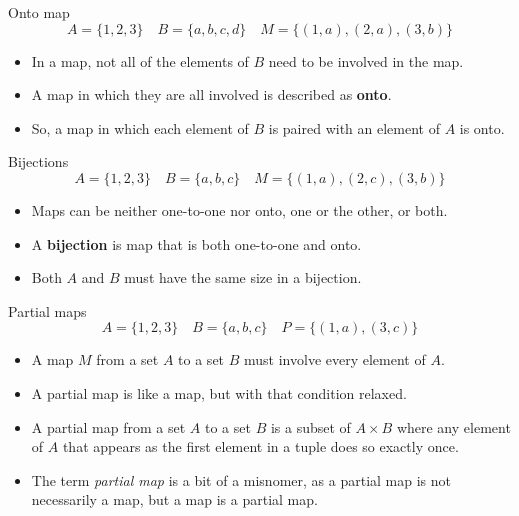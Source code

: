\documentclass{beamer}
\newenvironment{topdisp}{\color{gmitred}\vspace{-4mm}}{\vspace{-4mm}}
\begin{document}
\begin{frame}{Onto map}
  \begin{topdisp}
    $$ A = \{1,2,3\} \quad  B = \{a,b,c,d\} \quad  M = \{ (1,a), (2,a), (3,b) \} $$
  \end{topdisp}
  \begin{itemize}
    \setlength\itemsep{3mm}
    \item In a map, not all of the elements of $B$ need to be involved in the map.
    \item A map in which they are all involved is described as \textbf{onto}.
    \item So, a map in which each element of $B$ is paired with an element of $A$ is onto.
  \end{itemize}
\end{frame}

\begin{frame}{Bijections}
  \begin{topdisp}
    $$ A = \{1,2,3\} \quad  B = \{a,b,c\} \quad  M = \{ (1,a), (2,c), (3,b) \} $$
  \end{topdisp}
  \begin{itemize}
    \setlength\itemsep{3mm}
    \item Maps can be neither one-to-one nor onto, one or the other, or both.
    \item A \textbf{bijection} is map that is both one-to-one and onto.
    \item Both $A$ and $B$ must have the same size in a bijection.
  \end{itemize}
\end{frame}


\begin{frame}{Partial maps}
  \begin{topdisp}
    $$ A = \{1,2,3\} \quad  B = \{a,b,c\} \quad  P = \{ (1,a), (3,c) \} $$
  \end{topdisp}
  \begin{itemize}
    \setlength\itemsep{3mm}
    \item A map $M$ from a set $A$ to a set $B$ must involve every element of $A$.
    \item A partial map is like a map, but with that condition relaxed.
    \item A partial map from a set $A$ to a set $B$ is a subset of $A \times B$ where any element of $A$ that appears as the first element in a tuple does so exactly once.
    \item The term \emph{partial map} is a bit of a misnomer, as a partial map is not necessarily a map, but a map is a partial map.
  \end{itemize}
\end{frame}
\end{document}
